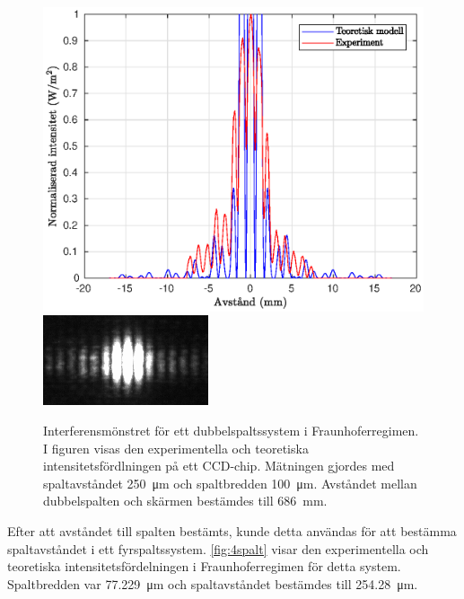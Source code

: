 \documentclass[a4paper]{article}
\begin{document}
\begin{figure}[h!]
	\centering
	\includegraphics[width=0.75\linewidth]{Data/Figurer/dubbelspalt.eps}
	\includegraphics[width=0.5\linewidth]{Data/Figurer/dubbelspalt.png}
	\caption{Interferensmönstret för ett dubbelspaltssystem i Fraunhoferregimen. I figuren visas den experimentella och teoretiska intensitetsfördlningen på ett CCD-chip. Mätningen gjordes med spaltavståndet \SI{250}{\micro\meter} och spaltbredden \SI{100}{\micro\meter}. Avståndet mellan dubbelspalten och skärmen bestämdes till \SI{686}{\milli\meter}.}
	\label{fig:dubbelspalt}
\end{figure}

\FloatBarrier

Efter att avståndet till spalten  bestämts, kunde detta användas för att bestämma spaltavståndet i ett fyrspaltssystem. \autoref{fig:4spalt} visar den experimentella och teoretiska intensitetsfördelningen i Fraunhoferregimen för detta system. Spaltbredden var \SI{77.229}{\micro\m} och spaltavståndet bestämdes till \SI{254.28}{\micro\m}.

\FloatBarrier
\end{document}
